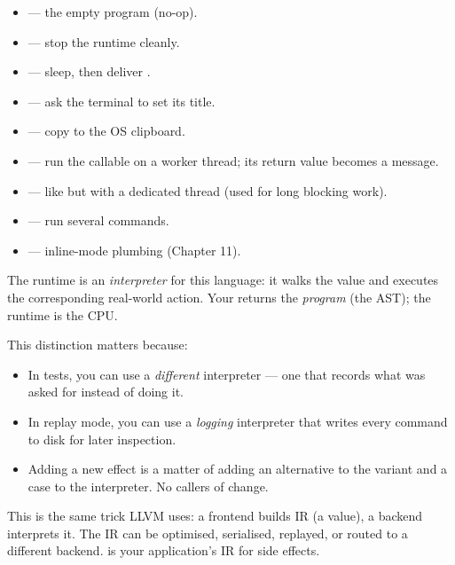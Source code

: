 \begin{itemize}[leftmargin=*]
  \item {} --- the empty program (no-op).
  \item {} --- stop the runtime cleanly.
  \item {} --- sleep, then deliver .
  \item {} --- ask the terminal to set its title.
  \item {} --- copy  to the OS
    clipboard.
  \item {} --- run the callable  on a worker
    thread; its return value becomes a message.
  \item {} --- like  but with a
    dedicated thread (used for long blocking work).
  \item {} --- run several commands.
  \item {} ---
    inline-mode plumbing (Chapter 11).
\end{itemize}

The runtime is an \emph{interpreter} for this language: it walks
the  value and executes the corresponding real-world
action. Your  returns the \emph{program} (the AST);
the runtime is the CPU.

This distinction matters because:

\begin{itemize}[leftmargin=*]
  \item In tests, you can use a \emph{different} interpreter ---
    one that records what was asked for instead of doing it.
  \item In replay mode, you can use a \emph{logging} interpreter
    that writes every command to disk for later inspection.
  \item Adding a new effect is a matter of adding an alternative
    to the variant and a case to the interpreter. No callers of
     change.
\end{itemize}

\begin{idea}
This is the same trick LLVM uses: a frontend builds IR (a value),
a backend interprets it. The IR can be optimised, serialised,
replayed, or routed to a different backend.  is
your application's IR for side effects.
\end{idea}

